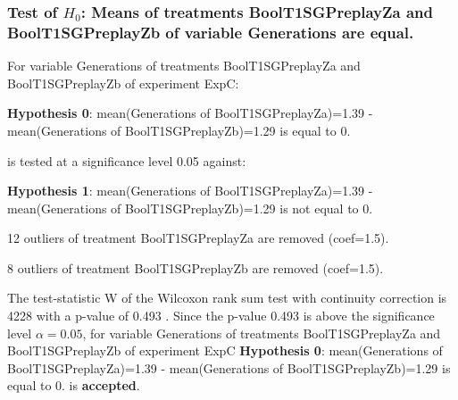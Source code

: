 \begin{frame}[t]
 \frametitle{Test of $H_{0}$: Means of treatments BoolT1SGPreplayZa and BoolT1SGPreplayZb of variable Generations are equal. }
 \scriptsize
 For variable Generations of treatments BoolT1SGPreplayZa and BoolT1SGPreplayZb of experiment ExpC:

\vspace{1mm}
{\bf Hypothesis 0}: mean(Generations of BoolT1SGPreplayZa)=1.39 - mean(Generations of BoolT1SGPreplayZb)=1.29 is equal to 0.


 \begin{center} is tested at a significance level 0.05 against: \end{center}

{\bf Hypothesis 1}: mean(Generations of BoolT1SGPreplayZa)=1.39 - mean(Generations of BoolT1SGPreplayZb)=1.29 is not equal to 0.
\vspace{1mm}
\vspace{1mm}

 12 outliers of treatment BoolT1SGPreplayZa are removed (coef=1.5).

 8 outliers of treatment BoolT1SGPreplayZb are removed (coef=1.5).
\vspace{1mm}
 
 The test-statistic W of the Wilcoxon rank sum test with continuity correction is 4228 with a p-value of 0.493 .
 Since the p-value 0.493 is above the significance level $\alpha= 0.05 $,
 for variable Generations of treatments BoolT1SGPreplayZa and BoolT1SGPreplayZb of experiment ExpC 
 {\bf Hypothesis 0}: mean(Generations of BoolT1SGPreplayZa)=1.39 - mean(Generations of BoolT1SGPreplayZb)=1.29 is equal to 0.
is {\bf accepted}.

 \end{frame}
